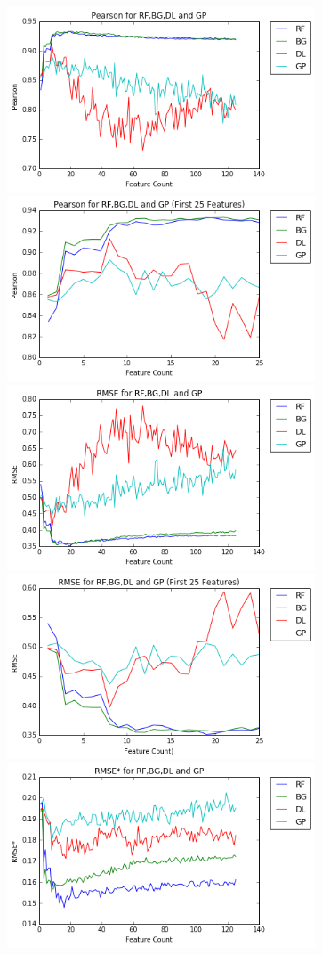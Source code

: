 \documentclass[journal]{IEEEtran}
\begin{document}
\begin{figure}[ht!]
\includegraphics[width=3.6in]{./pearsonall.png}
\includegraphics[width=3.6in]{./pearsonzoom.png}
\includegraphics[width=3.6in]{./rmseall.png}
\includegraphics[width=3.6in]{./rmsezoom.png}
\includegraphics[width=3.6in]{./epsilonrmseall.png}

\end{figure}
\end{document}
